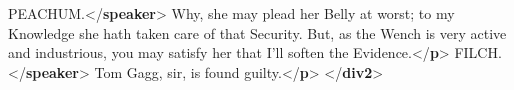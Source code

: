 \begin{shaded}
\mbox{}\newline 
\hspace*{1em}PEACHUM.{</\textbf{speaker}>}\mbox{}\newline 
\hspace*{1em}Why, she may plead her Belly at worst; to my\mbox{}\newline 
\hspace*{1em}\hspace*{1em}\hspace*{1em}\hspace*{1em} Knowledge she hath taken care of that Security.\mbox{}\newline 
\hspace*{1em}\hspace*{1em}\hspace*{1em}\hspace*{1em} But, as the Wench is very active and industrious,\mbox{}\newline 
\hspace*{1em}\hspace*{1em}\hspace*{1em}\hspace*{1em} you may satisfy her that I'll soften the Evidence.{</\textbf{p}>}\mbox{}\newline 
{}\mbox{}\newline 
{}\mbox{}\newline 
\hspace*{1em}FILCH.{</\textbf{speaker}>}\mbox{}\newline 
\hspace*{1em}Tom Gagg, sir, is found guilty.{</\textbf{p}>}\mbox{}\newline 
{}\mbox{}\newline 
{</\textbf{div2}>}\end{shaded}\egroup\par \par
